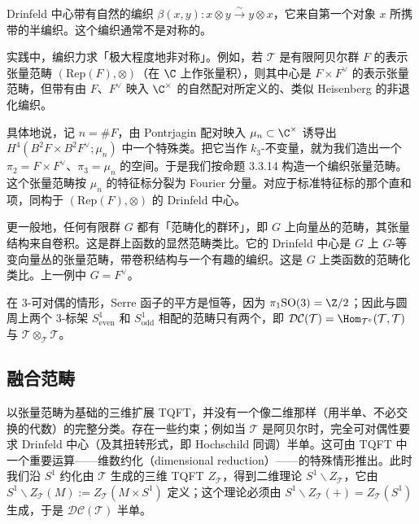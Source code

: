 Drinfeld 中心带有自然的编织 $\beta(x,y)\colon x\otimes y\xrightarrow{\sim}y\otimes x$，它来自第一个对象 $x$ 所携带的半编织。这个编织通常不是对称的。

\begin{remark}
实践中，编织力求「极大程度地非对称」。例如，若 $\mathcal{T}$ 是有限阿贝尔群 $F$ 的表示张量范畴 $(\mathrm{Rep}(F),\otimes)$（在 $\C$ 上作张量积），则其中心是 $F\times F^\vee$ 的表示张量范畴，但带有由 $F$、$F^\vee$ 映入 $\C^\times$ 的自然配对所定义的、类似 Heisenberg 的非退化编织。

具体地说，记 $n=\#F$，由 Pontrjagin 配对映入 $\mu_n\subset\C^\times$ 诱导出 $H^4(B^2F\times B^2F^\vee;\mu_n)$ 中一个特殊类。把它当作 $k_3$-不变量，就为我们造出一个 $\pi_2=F\times F^\vee$、$\pi_3=\mu_n$ 的空间。于是我们按命题 3.3.14 构造一个编织张量范畴。这个张量范畴按 $\mu_n$ 的特征标分裂为 Fourier 分量。对应于标准特征标的那个直和项，同构于 $(\mathrm{Rep}(F),\otimes)$ 的 Drinfeld 中心。

更一般地，任何有限群 $G$ 都有「范畴化的群环」，即 $G$ 上向量丛的范畴，其张量结构来自卷积。这是群上函数的显然范畴类比。它的 Drinfeld 中心是 $G$ 上 $G$-等变向量丛的张量范畴，带卷积结构与一个有趣的编织。这是 $G$ 上类函数的范畴化类比。上一例中 $G=F^\vee$。
\end{remark}

\begin{remark}
在 3-可对偶的情形，Serre 函子的平方是恒等，因为 $\pi_1\mathrm{SO}(3)=\Z/2$；因此与圆周上两个 3-标架 $S^1_{\mathrm{even}}$ 和 $S^1_{\mathrm{odd}}$ 相配的范畴只有两个，即 $\mathcal{DC}(\mathcal{T})=\Hom_{\mathcal{T}^e}(\mathcal{T},\mathcal{T})$ 与 $\mathcal{T}\otimes_{\mathcal{T}}\mathcal{T}$。
\end{remark}

\subsection{融合范畴}

以张量范畴为基础的三维扩展 TQFT，并没有一个像二维那样（用半单、不必交换的代数）的完整分类。存在一些约束；例如当 $\mathcal{T}$ 是阿贝尔时，完全可对偶性要求 Drinfeld 中心（及其扭转形式，即 Hochschild 同调）半单。这可由 TQFT 中一个重要运算——维数约化（dimensional reduction）——的特殊情形推出。此时我们沿 $S^1$ 约化由 $\mathcal{T}$ 生成的三维 TQFT $Z_{\mathcal{T}}$，得到二维理论 $S^1\backslash Z_{\mathcal{T}}$，它由 $S^1\backslash Z_{\mathcal{T}}(M):=Z_{\mathcal{T}}(M\times S^1)$ 定义；这个理论必须由 $S^1\backslash Z_{\mathcal{T}}(+)=Z_{\mathcal{T}}(S^1)$ 生成，于是 $\mathcal{DC}(\mathcal{T})$ 半单。

